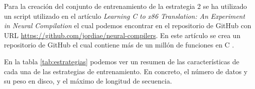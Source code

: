 Para la creación del conjunto de entrenamiento de la estrategia 2 se ha utilizado un script
utilizado en el artículo \textit{Learning C to x86 Translation: An Experiment in Neural Compilation}
el cual podemos encontrar en el repositorio de GitHub con URL \url{https://github.com/jordiae/neural-compilers}.
En este artículo se crea un repositorio de GitHub el cual contiene más de un millón de funciones en C
\cite{Armengol-EstapéJordi2021LCtx}.

En la tabla \ref{tab:estrategias} podemos ver un resumen de las características de cada una de las estrategias
de entrenamiento. En concreto, el número de datos y su peso en disco, y el máximo de longitud
de secuencia.

\begin{table}[H]
    \centering
    \caption[Tamaño de los \textit{training sets} utilizados]{Tamaño de los \textit{training sets} utilizados (Elaboración propia))}
    \label{tab:estrategias}
\end{table}










